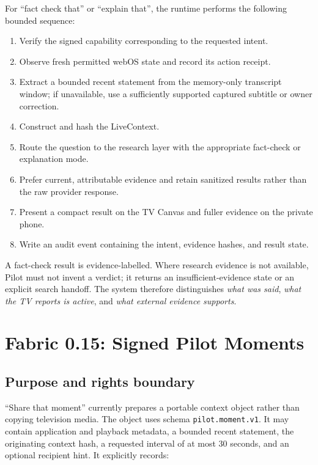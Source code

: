 \documentclass[11pt,a4paper]{article}
\begin{document}
For ``fact check that'' or ``explain that'', the runtime performs the following
bounded sequence:

\begin{enumerate}[leftmargin=*]
  \item Verify the signed capability corresponding to the requested intent.
  \item Observe fresh permitted webOS state and record its action receipt.
  \item Extract a bounded recent statement from the memory-only transcript
        window; if unavailable, use a sufficiently supported captured subtitle
        or owner correction.
  \item Construct and hash the LiveContext.
  \item Route the question to the research layer with the appropriate
        fact-check or explanation mode.
  \item Prefer current, attributable evidence and retain sanitized results
        rather than the raw provider response.
  \item Present a compact result on the TV Canvas and fuller evidence on the
        private phone.
  \item Write an audit event containing the intent, evidence hashes, and result
        state.
\end{enumerate}

A fact-check result is evidence-labelled.  Where research evidence is not
available, Pilot must not invent a verdict; it returns an insufficient-evidence
state or an explicit search handoff.  The system therefore distinguishes
\emph{what was said}, \emph{what the TV reports is active}, and \emph{what
external evidence supports}.

\section{Fabric 0.15: Signed Pilot Moments}

\subsection{Purpose and rights boundary}

``Share that moment'' currently prepares a portable context object rather than
copying television media.  The object uses schema
\texttt{pilot.moment.v1}.  It may contain application and playback metadata, a
bounded recent statement, the originating context hash, a requested interval
of at most 30 seconds, and an optional recipient hint.  It explicitly records:
\end{document}

